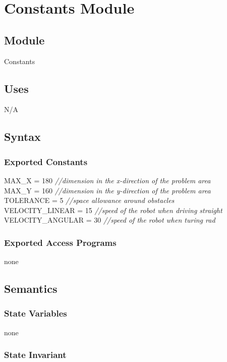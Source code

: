 \documentclass[12pt]{article}
\begin{document}
\section* {Constants Module}

\subsection*{Module}

Constants

\subsection* {Uses}

N/A

\subsection* {Syntax}

\subsubsection* {Exported Constants}

MAX\_X = 180 {\it //dimension in the x-direction of the problem area}\\
MAX\_Y = 160 {\it //dimension in the y-direction of the problem area}\\ 
TOLERANCE = 5 {\it //space allowance around obstacles}\\
VELOCITY\_LINEAR = 15 {\it //speed of the robot when driving straight}\\
VELOCITY\_ANGULAR = 30 {\it //speed of the robot when turing rad}

\subsubsection* {Exported Access Programs}

none

\subsection* {Semantics}

\subsubsection* {State Variables}

none

\subsubsection* {State Invariant}
\end{document}
